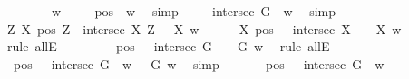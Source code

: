 \begin{isabellebody}
\ {\isacharminus}\isanewline
\ \ \isacommand{{\isacharbraceleft}}\isamarkupfalse%
\isanewline
\ \ \isamarkupfalse%
\ w\isanewline
\ \ \isamarkupfalse%
\ {}{\isacharcolon}\ {\isachardoublequoteopen}pos\ {\isasymP}\ w{\isachardoublequoteclose}\ \isamarkupfalse%
\ simp\isanewline
\ \ \isamarkupfalse%
\ {}{\isacharcolon}\ {\isachardoublequoteopen}intersec\ G\ {\isasymP}\ w{\isachardoublequoteclose}\ \isamarkupfalse%
\ simp\isanewline
\ \ \isacommand{{\isacharbraceleft}}\isamarkupfalse%
\ \ \ \ \isanewline
\ \ \ \ \isamarkupfalse%
\ {\isachardoublequoteopen}{\isacharparenleft}\isactrlbold {\isasymforall}Z\ X{\isachardot}\ {\isacharparenleft}pos\ Z\ \isactrlbold {\isasymand}\ intersec\ X\ Z{\isacharparenright}\ \isactrlbold {\isasymrightarrow}\ {\isasymP}\ X{\isacharparenright}\ w{\isachardoublequoteclose}\isanewline
\ \ \ \ \isamarkupfalse%
\ {\isachardoublequoteopen}{\isacharparenleft}\isactrlbold {\isasymforall}X{\isachardot}\ {\isacharparenleft}{\isacharparenleft}pos\ {\isasymP}{\isacharparenright}\ \isactrlbold {\isasymand}\ {\isacharparenleft}intersec\ X\ {\isasymP}{\isacharparenright}{\isacharparenright}\ \isactrlbold {\isasymrightarrow}\ {\isasymP}\ X{\isacharparenright}\ w{\isachardoublequoteclose}\ \ \isamarkupfalse%
\ {\isacharparenleft}rule\ allE{\isacharparenright}\ \ \ \isanewline
\ \ \ \ \isamarkupfalse%
\ {\isachardoublequoteopen}{\isacharparenleft}{\isacharparenleft}{\isacharparenleft}pos\ {\isasymP}{\isacharparenright}\ \isactrlbold {\isasymand}\ {\isacharparenleft}intersec\ G\ {\isasymP}{\isacharparenright}{\isacharparenright}\ \isactrlbold {\isasymrightarrow}\ {\isasymP}\ G{\isacharparenright}\ w{\isachardoublequoteclose}\ \isamarkupfalse%
\ {\isacharparenleft}rule\ allE{\isacharparenright}\isanewline
\ \ \ \ \isamarkupfalse%
\ {}{\isacharcolon}\ {\isachardoublequoteopen}{\isacharparenleft}{\isacharparenleft}pos\ {\isasymP}\ \isactrlbold {\isasymand}\ intersec\ G\ {\isasymP}{\isacharparenright}\ w{\isacharparenright}\ {\isasymlongrightarrow}\ {\isasymP}\ G\ w{\isachardoublequoteclose}\ \isamarkupfalse%
\ simp\isanewline
\ \ \ \ \isamarkupfalse%
\ {}{\isacharcolon}\ {\isachardoublequoteopen}{\isacharparenleft}{\isacharparenleft}pos\ {\isasymP}{\isacharparenright}\ \isactrlbold {\isasymand}\ {\isacharparenleft}intersec\ G\ {\isasymP}{\isacharparenright}{\isacharparenright}\ w{\isachardoublequoteclose}\ \isamarkupfalse%

\end{isabellebody}
